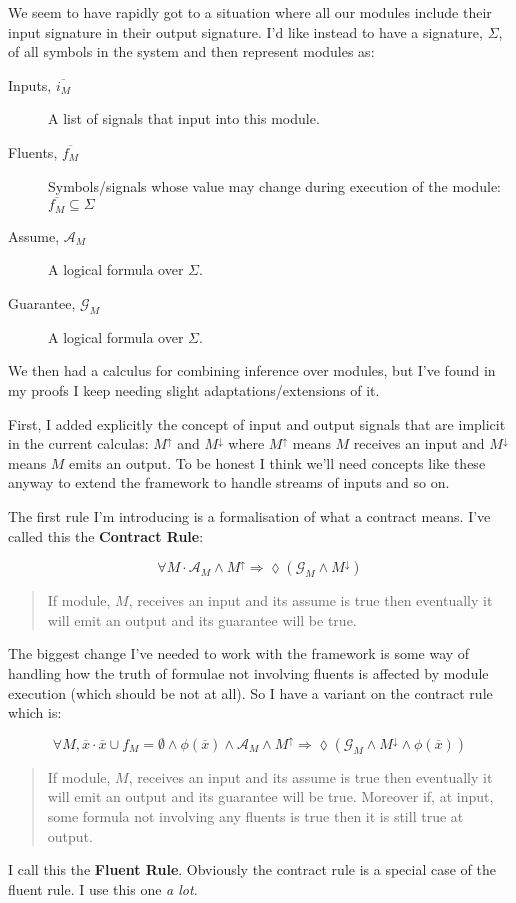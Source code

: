 \documentclass{blue-book}
\let\sometime=\lozenge
\begin{document}
We seem to have rapidly got to a situation where all our modules include their input signature in their output signature.  I'd like instead to have a signature, $\Sigma$, of all symbols in the system and then represent modules as:
\begin{description}
\item[Inputs, $\overline{i_M}$] A list of signals that input into this module.
\item[Fluents, $\overline{f_M}$] Symbols/signals whose value may change during execution of the module: $\overline{f_M} \subseteq \Sigma$
\item[Assume, $\mathcal{A}_M$] A logical formula over $\Sigma$.
\item[Guarantee, $\mathcal{G}_M$] A logical formula over $\Sigma$.
\end{description}

We then had a calculus for combining inference over modules, but I've found in my proofs I keep needing slight adaptations/extensions of it.  

First, I added explicitly the concept of input and output signals that are implicit in the current calculas:  $M^{\uparrow}$ and $M^{\downarrow}$ where $M^{\uparrow}$ means $M$ receives an input and $M^{\downarrow}$ means $M$ emits an output.  To be honest I think we'll need concepts like these anyway to extend the framework to handle streams of inputs and so on.  

The first rule I'm introducing is a formalisation of what a contract means.  I've called this the {\bf Contract Rule}:

\begin{equation}
\forall M \cdot \mathcal{A}_M \land M^{\uparrow} \Rightarrow \sometime (\mathcal{G}_M \land M^{\downarrow})
\label{eq:contract_rule}
\end{equation}
\begin{quote}
If module, $M$, receives an input and its assume is true then eventually it will emit an output and its guarantee will be true.
\end{quote}

The biggest change I've needed to work with the framework is some way of handling how the truth of formulae not involving fluents is affected by module execution (which should be not at all).  So I have a variant on the contract rule which is:

\begin{equation}
\forall M, \overline{x} \cdot \overline{x} \cup f_{M} = \emptyset \land \phi(\overline{x}) \land \mathcal{A}_M \land M^{\uparrow} \Rightarrow \sometime (\mathcal{G}_M \land M^{\downarrow} \land \phi(\overline{x}))
\label{eq:fluent_rule}
\end{equation}
\begin{quote}
If module, $M$, receives an input and its assume is true then eventually it will emit an output and its guarantee will be true.
Moreover if, at input, some formula not involving any fluents is true then it is still true at output.  
\end{quote}
I call this the {\bf Fluent Rule}.  Obviously the contract rule is a special case of the fluent rule.  I use this one \emph{a lot}.
\end{document}
